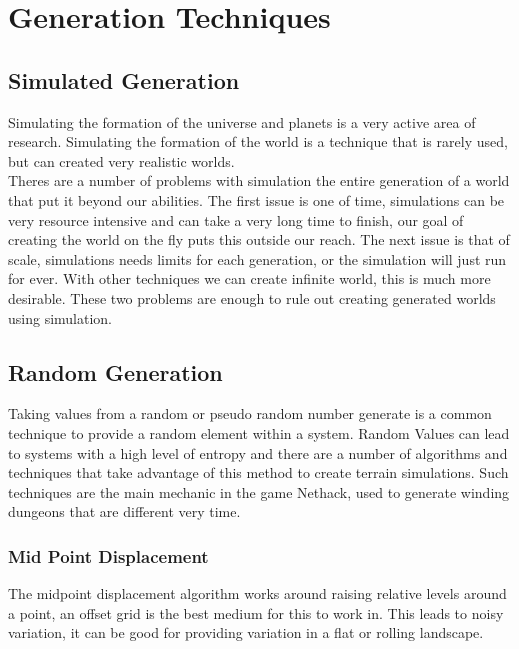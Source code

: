 \section{Generation Techniques}

\subsection{Simulated Generation}
Simulating the formation of the universe and planets is a very active area of 
research. Simulating the formation of the world is a technique that is rarely
used, but can created very realistic worlds.\\

Theres are a number of problems with
simulation the entire generation of a world that put it beyond our abilities. 
The first issue is one of time, simulations can be very resource intensive and 
can take a very long time to finish, our goal of creating the world on the fly 
puts this outside our reach. The next issue is that of scale, simulations needs
limits for each generation, or the simulation will just run for ever. With other
techniques we can create infinite world, this is much more desirable. These two
problems are enough to rule out creating generated worlds using simulation.\\

\subsection{Random Generation}
Taking values from a random or pseudo random number generate is a common 
technique to provide a random element within a system. Random Values can lead to
systems with a high level of entropy and there are a number of algorithms and 
techniques that take advantage of this method to create terrain simulations. Such
techniques are the main mechanic in the game Nethack, used to generate winding
dungeons that are different very time.\\

\subsubsection*{Mid Point Displacement}
The midpoint displacement algorithm works around raising relative levels around a
point, an offset grid is the best medium for this to work in. This leads to noisy
variation, it can be good for providing variation in a flat or rolling landscape.\\

